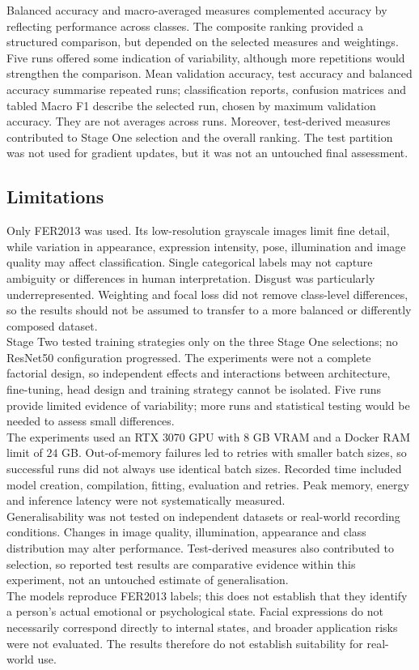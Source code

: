 \documentclass[10pt, a4paper]{article}
\let\oldsubsection\subsection
\renewcommand{\subsection}{%
    \Needspace{4\baselineskip}%
    \oldsubsection
}
\begin{document}
			Balanced accuracy and macro-averaged measures complemented accuracy by reflecting performance across classes. The composite ranking provided a structured comparison, but depended on the selected measures and weightings. Five runs offered some indication of variability, although more repetitions would strengthen the comparison. Mean validation accuracy, test accuracy and balanced accuracy summarise repeated runs; classification reports, confusion matrices and tabled Macro F1 describe the selected run, chosen by maximum validation accuracy. They are not averages across runs. Moreover, test-derived measures contributed to Stage One selection and the overall ranking. The test partition was not used for gradient updates, but it was not an untouched final assessment.
		
		\subsection{Limitations}
			
			Only FER2013 was used. Its low-resolution grayscale images limit fine detail, while variation in appearance, expression intensity, pose, illumination and image quality may affect classification. Single categorical labels may not capture ambiguity or differences in human interpretation. Disgust was particularly underrepresented. Weighting and focal loss did not remove class-level differences, so the results should not be assumed to transfer to a more balanced or differently composed dataset.\\
			Stage Two tested training strategies only on the three Stage One selections; no ResNet50 configuration progressed. The experiments were not a complete factorial design, so independent effects and interactions between architecture, fine-tuning, head design and training strategy cannot be isolated. Five runs provide limited evidence of variability; more runs and statistical testing would be needed to assess small differences.\\
			The experiments used an RTX $3070$ GPU with $8$ GB VRAM and a Docker RAM limit of $24$ GB. Out-of-memory failures led to retries with smaller batch sizes, so successful runs did not always use identical batch sizes. Recorded time included model creation, compilation, fitting, evaluation and retries. Peak memory, energy and inference latency were not systematically measured.\\
			Generalisability was not tested on independent datasets or real-world recording conditions. Changes in image quality, illumination, appearance and class distribution may alter performance. Test-derived measures also contributed to selection, so reported test results are comparative evidence within this experiment, not an untouched estimate of generalisation.\\
			The models reproduce FER2013 labels; this does not establish that they identify a person's actual emotional or psychological state. Facial expressions do not necessarily correspond directly to internal states, and broader application risks were not evaluated. The results therefore do not establish suitability for real-world use.
	
\end{document}
